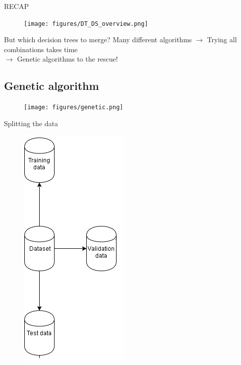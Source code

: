 \documentclass[english]{beamer}
\begin{document}
{
	\begin{frame}{RECAP}
		\begin{figure}
			\centering
			\texttt{[image: figures/DT\_DS\_overview.png]}
		\end{figure}
	\end{frame} }
	
\begin{frame}{But which decision trees to merge?}
	Many different algorithms $\rightarrow$ Trying all combinations takes time \\
	\vspace{2em}
    $\rightarrow$	Genetic algorithms to the rescue!
\end{frame}


\subsection*{Genetic algorithm}
{
\begin{frame}{}
	\begin{figure}
		\centering
		\texttt{[image: figures/genetic.png]}
	\end{figure}	
\end{frame} }

\begin{frame}{Splitting the data}
	\vspace{-1em}
	\begin{figure}
		\centering
		\includegraphics[scale=0.5]{figures/split_data.png}
	\end{figure}	
\end{frame}
\end{document}
